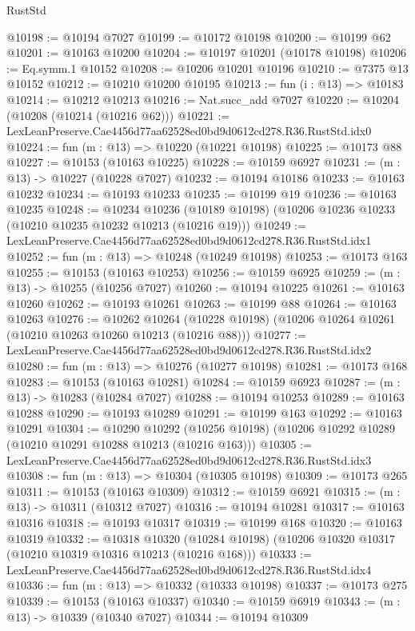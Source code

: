 \begin{lexlean}{RustStd}
\begin{coremodule}
@10198 := @10194 @7027
@10199 := @10172 @10198
@10200 := @10199 @62
@10201 := @10163 @10200
@10204 := @10197 @10201 (@10178 @10198)
@10206 := Eq.symm.{1} @10152
@10208 := @10206 @10201 @10196
@10210 := @7375 @13 @10152
@10212 := @10210 @10200 @10195
@10213 := fun (i : @13) => @10183
@10214 := @10212 @10213
@10216 := Nat.succ_add @7027
@10220 := @10204 (@10208 (@10214 (@10216 @62)))
@10221 := LexLeanPreserve.Cae4456d77aa62528ed0bd9d0612cd278.R36.RustStd.idx0
@10224 := fun (m : @13) => @10220 (@10221 @10198)
@10225 := @10173 @88
@10227 := @10153 (@10163 @10225)
@10228 := @10159 @6927
@10231 := (m : @13) -> @10227 (@10228 @7027)
@10232 := @10194 @10186
@10233 := @10163 @10232
@10234 := @10193 @10233
@10235 := @10199 @19
@10236 := @10163 @10235
@10248 := @10234
    @10236
    (@10189 @10198)
    (@10206 @10236 @10233 (@10210 @10235 @10232 @10213 (@10216 @19)))
@10249 := LexLeanPreserve.Cae4456d77aa62528ed0bd9d0612cd278.R36.RustStd.idx1
@10252 := fun (m : @13) => @10248 (@10249 @10198)
@10253 := @10173 @163
@10255 := @10153 (@10163 @10253)
@10256 := @10159 @6925
@10259 := (m : @13) -> @10255 (@10256 @7027)
@10260 := @10194 @10225
@10261 := @10163 @10260
@10262 := @10193 @10261
@10263 := @10199 @88
@10264 := @10163 @10263
@10276 := @10262
    @10264
    (@10228 @10198)
    (@10206 @10264 @10261 (@10210 @10263 @10260 @10213 (@10216 @88)))
@10277 := LexLeanPreserve.Cae4456d77aa62528ed0bd9d0612cd278.R36.RustStd.idx2
@10280 := fun (m : @13) => @10276 (@10277 @10198)
@10281 := @10173 @168
@10283 := @10153 (@10163 @10281)
@10284 := @10159 @6923
@10287 := (m : @13) -> @10283 (@10284 @7027)
@10288 := @10194 @10253
@10289 := @10163 @10288
@10290 := @10193 @10289
@10291 := @10199 @163
@10292 := @10163 @10291
@10304 := @10290
    @10292
    (@10256 @10198)
    (@10206 @10292 @10289 (@10210 @10291 @10288 @10213 (@10216 @163)))
@10305 := LexLeanPreserve.Cae4456d77aa62528ed0bd9d0612cd278.R36.RustStd.idx3
@10308 := fun (m : @13) => @10304 (@10305 @10198)
@10309 := @10173 @265
@10311 := @10153 (@10163 @10309)
@10312 := @10159 @6921
@10315 := (m : @13) -> @10311 (@10312 @7027)
@10316 := @10194 @10281
@10317 := @10163 @10316
@10318 := @10193 @10317
@10319 := @10199 @168
@10320 := @10163 @10319
@10332 := @10318
    @10320
    (@10284 @10198)
    (@10206 @10320 @10317 (@10210 @10319 @10316 @10213 (@10216 @168)))
@10333 := LexLeanPreserve.Cae4456d77aa62528ed0bd9d0612cd278.R36.RustStd.idx4
@10336 := fun (m : @13) => @10332 (@10333 @10198)
@10337 := @10173 @275
@10339 := @10153 (@10163 @10337)
@10340 := @10159 @6919
@10343 := (m : @13) -> @10339 (@10340 @7027)
@10344 := @10194 @10309

\end{coremodule}
\end{lexlean}
